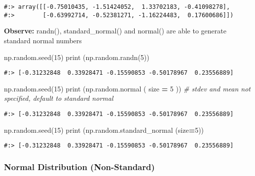 \documentclass[
]{book}
\newenvironment{Shaded}{\begin{snugshade}}{\end{snugshade}}
\newcommand{\BuiltInTok}[1]{#1}
\newcommand{\CommentTok}[1]{\textcolor[rgb]{0.37,0.37,0.37}{\textit{#1}}}
\newcommand{\DecValTok}[1]{\textcolor[rgb]{0.06,0.06,0.06}{#1}}
\newcommand{\NormalTok}[1]{#1}
\newcommand{\OperatorTok}[1]{\textcolor[rgb]{0.43,0.43,0.43}{\textbf{#1}}}
\begin{document}
\begin{verbatim}
#:> array([[-0.75010435, -1.51424052,  1.33702183, -0.41098278],
#:>        [-0.63992714, -0.52381271, -1.16224483,  0.17600686]])
\end{verbatim}

\textbf{Observe:} randn(), standard\_normal() and normal() are able to generate standard normal numbers

\begin{Shaded}
\begin{Highlighting}[]
\NormalTok{np.random.seed(}\DecValTok{15}\NormalTok{)}
\BuiltInTok{print}\NormalTok{ (np.random.randn(}\DecValTok{5}\NormalTok{))}
\end{Highlighting}
\end{Shaded}

\begin{verbatim}
#:> [-0.31232848  0.33928471 -0.15590853 -0.50178967  0.23556889]
\end{verbatim}

\begin{Shaded}
\begin{Highlighting}[]
\NormalTok{np.random.seed(}\DecValTok{15}\NormalTok{)}
\BuiltInTok{print}\NormalTok{ (np.random.normal ( size }\OperatorTok{=} \DecValTok{5}\NormalTok{ )) }\CommentTok{\# stdev and mean not specified, default to standard normal}
\end{Highlighting}
\end{Shaded}

\begin{verbatim}
#:> [-0.31232848  0.33928471 -0.15590853 -0.50178967  0.23556889]
\end{verbatim}

\begin{Shaded}
\begin{Highlighting}[]
\NormalTok{np.random.seed(}\DecValTok{15}\NormalTok{)}
\BuiltInTok{print}\NormalTok{ (np.random.standard\_normal (size}\OperatorTok{=}\DecValTok{5}\NormalTok{))}
\end{Highlighting}
\end{Shaded}

\begin{verbatim}
#:> [-0.31232848  0.33928471 -0.15590853 -0.50178967  0.23556889]
\end{verbatim}

\hypertarget{normal-distribution-non-standard}{%
\subsubsection{Normal Distribution (Non-Standard)}\label{normal-distribution-non-standard}}
\end{document}

